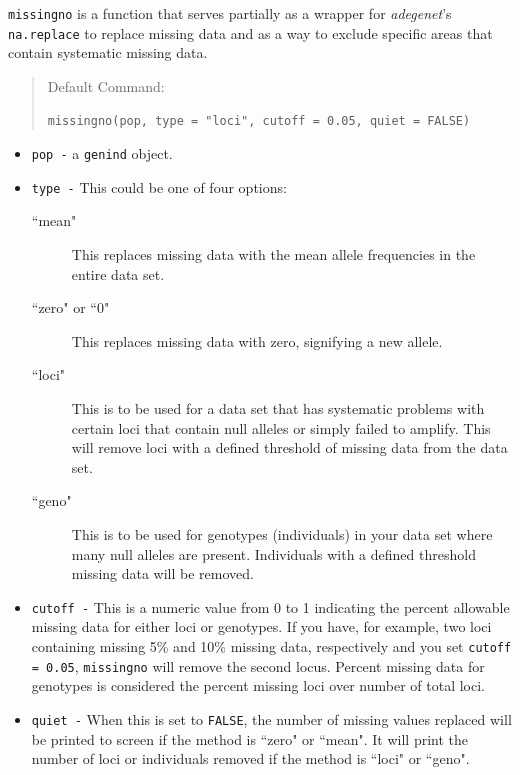 \documentclass[letterpaper]{article}\usepackage[]{graphicx}\usepackage[]{color}
\makeatletter
\newenvironment{kframe}{%
 \def\at@end@of@kframe{}%
 \ifinner\ifhmode%
  \def\at@end@of@kframe{\end{minipage}}%
  \begin{minipage}{\columnwidth}%
 \fi\fi%
 \def\FrameCommand##1{\hskip\@totalleftmargin \hskip-\fboxsep
 \colorbox{shadecolor}{##1}\hskip-\fboxsep
     \hskip-\linewidth \hskip-\@totalleftmargin \hskip\columnwidth}%
 \MakeFramed {\advance\hsize-\width
   \@totalleftmargin\z@ \linewidth\hsize
   \@setminipage}}%
 {\par\unskip\endMakeFramed%
 \at@end@of@kframe}
\newenvironment{knitrout}{}{} %
\newcommand{\tab}{\hspace*{1em}}
\newcommand{\adegenet}{\textit{adegenet}}
\makeatother
\begin{document}
\tab\tab \texttt{missingno} is a function that serves partially as a wrapper for \adegenet{}'s \texttt{na.replace} to replace missing data and as a way to exclude specific areas that contain systematic missing data.  
\begin{quote}
Default Command:
\begin{knitrout}
\color{fgcolor}\begin{kframe}
\begin{verbatim}
missingno(pop, type = "loci", cutoff = 0.05, quiet = FALSE)
\end{verbatim}
\end{kframe}
\end{knitrout}

\end{quote}
\begin{itemize}
  \item \texttt{pop -} a \texttt{genind} object.
  \item \texttt{type -} This could be one of four options:
    \begin{description}
      \item[ ``mean"] This replaces missing data with the mean allele frequencies in the entire data set.
      \item[ ``zero" or ``0"] This replaces missing data with zero, signifying a new allele.
      \item[ ``loci"] This is to be used for a data set that has systematic problems with certain loci that contain null alleles or simply failed to amplify. This will remove loci with a defined threshold of missing data from the data set.
      \item[ ``geno"] This is to be used for genotypes (individuals) in your data set where many null alleles are present. Individuals with a defined threshold missing data will be removed.
    \end{description}
    \item \texttt{cutoff -} This is a numeric value from 0 to 1 indicating the percent allowable missing data for either loci or genotypes. If you have, for example, two loci containing missing 5\% and 10\% missing data, respectively and you set \texttt{cutoff = 0.05}, \texttt{missingno} will remove the second locus. Percent missing data for genotypes is considered the percent missing loci over number of total loci. 
    \item \texttt{quiet -} When this is set to \texttt{FALSE}, the number of missing values replaced will be printed to screen if the method is ``zero" or ``mean". It will print the number of loci or individuals removed if the method is ``loci" or ``geno".
\end{itemize}
\end{document}
